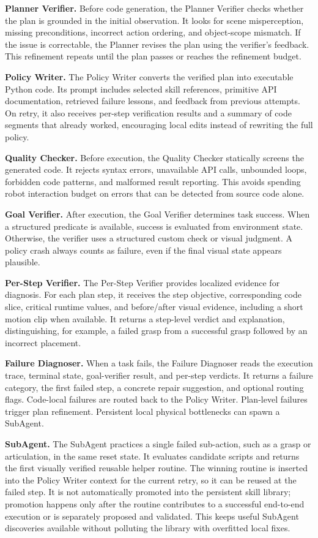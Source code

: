 \documentclass{llmxive}
\begin{document}
\textbf{Planner Verifier.}
Before code generation, the Planner Verifier checks whether the plan is grounded
in the initial observation. It looks for scene misperception, missing
preconditions, incorrect action ordering, and object-scope mismatch. If the
issue is correctable, the Planner revises the plan using the verifier's
feedback. This refinement repeats until the plan passes or reaches the
refinement budget.

\textbf{Policy Writer.}
The Policy Writer converts the verified plan into executable Python code. Its
prompt includes selected skill references, primitive API documentation,
retrieved failure lessons, and feedback from previous attempts. On retry, it
also receives per-step verification results and a summary of code segments that
already worked, encouraging local edits instead of rewriting the full policy.

\textbf{Quality Checker.}
Before execution, the Quality Checker statically screens the generated code. It
rejects syntax errors, unavailable API calls, unbounded loops, forbidden code
patterns, and malformed result reporting. This avoids spending robot
interaction budget on errors that can be detected from source code alone.

\textbf{Goal Verifier.}
After execution, the Goal Verifier determines task success. When a structured
predicate is available, success is evaluated from environment state. Otherwise,
the verifier uses a structured custom check or visual judgment. A policy crash
always counts as failure, even if the final visual state appears plausible.

\textbf{Per-Step Verifier.}
The Per-Step Verifier provides localized evidence for diagnosis. For each plan
step, it receives the step objective, corresponding code slice, critical runtime
values, and before/after visual evidence, including a short motion clip when
available. It returns a step-level verdict and explanation, distinguishing, for
example, a failed grasp from a successful grasp followed by an incorrect
placement.

\textbf{Failure Diagnoser.}
When a task fails, the Failure Diagnoser reads the execution trace, terminal
state, goal-verifier result, and per-step verdicts. It returns a failure
category, the first failed step, a concrete repair suggestion, and optional
routing flags. Code-local failures are routed back to the Policy Writer.
Plan-level failures trigger plan refinement. Persistent local physical
bottlenecks can spawn a SubAgent.

\textbf{SubAgent.}
The SubAgent practices a single failed sub-action, such as a grasp or
articulation, in the same reset state. It evaluates candidate scripts and
returns the first visually verified reusable helper routine. The winning
routine is inserted into the Policy Writer context for the current retry, so it
can be reused at the failed step. It is not automatically promoted into the
persistent skill library; promotion happens only after the routine contributes
to a successful end-to-end execution or is separately proposed and validated.
This keeps useful SubAgent discoveries available without polluting the library
with overfitted local fixes.
\end{document}
